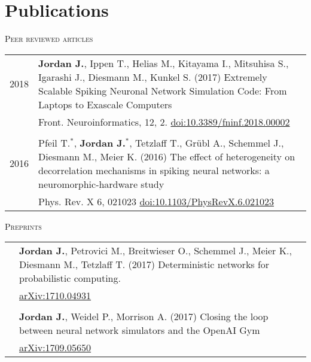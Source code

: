 \section{Publications}
\textsc{Peer reviewed articles}
\begin{longtable}{>{\hfill}p{1.6cm} p{}}
  2018 & \textbf{Jordan J.}, Ippen T., Helias M., Kitayama I., Mitsuhisa S., Igarashi J., Diesmann M., Kunkel S. (2017) Extremely Scalable Spiking Neuronal Network Simulation Code: From Laptops to Exascale Computers \\
  & \footnotesize Front. Neuroinformatics, 12, 2. \href{https://doi.org/10.3389/fninf.2018.00002}{doi:10.3389/fninf.2018.00002} \\
  \multicolumn{2}{c}{} \\
  2016 & Pfeil T.$^*$, \textbf{Jordan J.}$^*$, Tetzlaff T., Gr\"ubl A., Schemmel J., Diesmann M., Meier K. (2016) The effect of heterogeneity on decorrelation mechanisms in spiking neural networks: a neuromorphic-hardware study \\
  & \footnotesize Phys. Rev. X 6, 021023 \href{http://dx.doi.org/10.1103/PhysRevX.6.021023}{doi:10.1103/PhysRevX.6.021023}
\end{longtable}

\textsc{Preprints}
\begin{longtable}{>{\hfill}p{1.6cm} p{}}
  & \textbf{Jordan J.}, Petrovici M., Breitwieser O., Schemmel J., Meier K., Diesmann M., Tetzlaff T. (2017)  Deterministic networks for probabilistic computing. \\
  & \footnotesize \href{https://arxiv.org/abs/1710.04931}{arXiv:1710.04931} \\
  \multicolumn{2}{c}{} \\
  & \textbf{Jordan J.}, Weidel P., Morrison A. (2017) Closing the loop between neural network simulators and the OpenAI Gym \\
  & \footnotesize \href{https://arxiv.org/abs/1709.05650}{arXiv:1709.05650}
\end{longtable}


